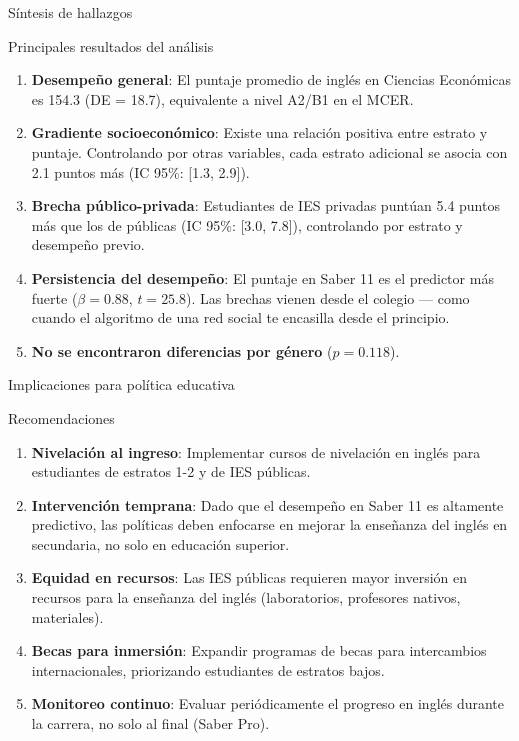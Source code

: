 \documentclass[aspectratio=169, 11pt]{beamer}
\begin{document}
\begin{frame}{Síntesis de hallazgos}
\begin{block}{Principales resultados del análisis}
\begin{enumerate}
\item \textbf{Desempeño general}: El puntaje promedio de inglés en Ciencias Econ\'omicas es 154.3 (DE = 18.7), equivalente a nivel A2/B1 en el MCER.

\item \textbf{Gradiente socioeconómico}: Existe una relación positiva entre estrato y puntaje. Controlando por otras variables, cada estrato adicional se asocia con 2.1 puntos más (IC 95\%: [1.3, 2.9]).

\item \textbf{Brecha público-privada}: Estudiantes de IES privadas puntúan 5.4 puntos más que los de públicas (IC 95\%: [3.0, 7.8]), controlando por estrato y desempeño previo.

\item \textbf{Persistencia del desempe\~no}: El puntaje en Saber 11 es el predictor m\'as fuerte ($\beta = 0.88$, $t = 25.8$). Las brechas vienen desde el colegio --- como cuando el algoritmo de una red social te encasilla desde el principio.

\item \textbf{No se encontraron diferencias por género} ($p = 0.118$).
\end{enumerate}
\end{block}
\end{frame}

\begin{frame}{Implicaciones para política educativa}
\begin{alertblock}{Recomendaciones}
\begin{enumerate}
\item \textbf{Nivelación al ingreso}: Implementar cursos de nivelación en inglés para estudiantes de estratos 1-2 y de IES públicas.

\item \textbf{Intervención temprana}: Dado que el desempeño en Saber 11 es altamente predictivo, las políticas deben enfocarse en mejorar la enseñanza del inglés en secundaria, no solo en educación superior.

\item \textbf{Equidad en recursos}: Las IES públicas requieren mayor inversión en recursos para la enseñanza del inglés (laboratorios, profesores nativos, materiales).

\item \textbf{Becas para inmersión}: Expandir programas de becas para intercambios internacionales, priorizando estudiantes de estratos bajos.

\item \textbf{Monitoreo continuo}: Evaluar periódicamente el progreso en inglés durante la carrera, no solo al final (Saber Pro).
\end{enumerate}
\end{alertblock}
\end{frame}
\end{document}
